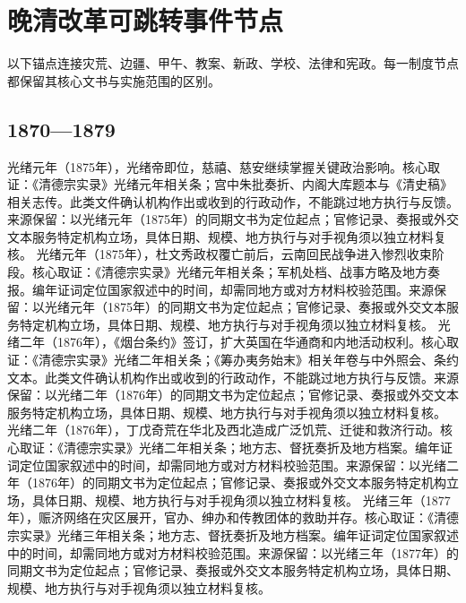 \section{晚清改革可跳转事件节点}
以下锚点连接灾荒、边疆、甲午、教案、新政、学校、法律和宪政。每一制度节点都保留其核心文书与实施范围的区别。
\subsection{1870—1879}
光绪元年（1875年），光绪帝即位，慈禧、慈安继续掌握关键政治影响。核心取证：《清德宗实录》光绪元年相关条；宫中朱批奏折、内阁大库题本与《清史稿》相关志传。此类文件确认机构作出或收到的行政动作，不能跳过地方执行与反馈。来源保留：以光绪元年（1875年）的同期文书为定位起点；官修记录、奏报或外交文本服务特定机构立场，具体日期、规模、地方执行与对手视角须以独立材料复核。
光绪元年（1875年），杜文秀政权覆亡前后，云南回民战争进入惨烈收束阶段。核心取证：《清德宗实录》光绪元年相关条；军机处档、战事方略及地方奏报。编年证词定位国家叙述中的时间，却需同地方或对方材料校验范围。来源保留：以光绪元年（1875年）的同期文书为定位起点；官修记录、奏报或外交文本服务特定机构立场，具体日期、规模、地方执行与对手视角须以独立材料复核。
光绪二年（1876年），《烟台条约》签订，扩大英国在华通商和内地活动权利。核心取证：《清德宗实录》光绪二年相关条；《筹办夷务始末》相关年卷与中外照会、条约文本。此类文件确认机构作出或收到的行政动作，不能跳过地方执行与反馈。来源保留：以光绪二年（1876年）的同期文书为定位起点；官修记录、奏报或外交文本服务特定机构立场，具体日期、规模、地方执行与对手视角须以独立材料复核。
光绪二年（1876年），丁戊奇荒在华北及西北造成广泛饥荒、迁徙和救济行动。核心取证：《清德宗实录》光绪二年相关条；地方志、督抚奏折及地方档案。编年证词定位国家叙述中的时间，却需同地方或对方材料校验范围。来源保留：以光绪二年（1876年）的同期文书为定位起点；官修记录、奏报或外交文本服务特定机构立场，具体日期、规模、地方执行与对手视角须以独立材料复核。
光绪三年（1877年），赈济网络在灾区展开，官办、绅办和传教团体的救助并存。核心取证：《清德宗实录》光绪三年相关条；地方志、督抚奏折及地方档案。编年证词定位国家叙述中的时间，却需同地方或对方材料校验范围。来源保留：以光绪三年（1877年）的同期文书为定位起点；官修记录、奏报或外交文本服务特定机构立场，具体日期、规模、地方执行与对手视角须以独立材料复核。
